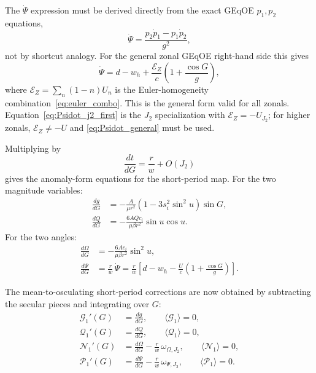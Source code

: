\documentclass[11pt]{article}
\begin{document}
The $\dot\Psi$ expression must be derived directly from the exact GEqOE
$p_1,p_2$ equations,
\begin{equation}
\dot\Psi = \frac{p_2 \dot p_1 - p_1 \dot p_2}{g^2},
\end{equation}
not by shortcut analogy. For the general zonal GEqOE right-hand side this
gives
\begin{equation}
\dot\Psi = d - w_h + \frac{\mathcal E_Z}{c}
\left(1 + \frac{\cos G}{g}\right),
\label{eq:Psidot_general}
\end{equation}
where $\mathcal E_Z = \sum_n (1-n) U_n$ is the Euler-homogeneity
combination~\eqref{eq:euler_combo}. This is the general form valid for
all zonals. Equation~\eqref{eq:Psidot_j2_first} is the $J_2$
specialization with $\mathcal E_Z = -U_{J_2}$; for higher zonals,
$\mathcal E_Z \neq -U$ and \eqref{eq:Psidot_general} must be used.

Multiplying by
\begin{equation}
\frac{dt}{dG} = \frac{r}{w} + O(J_2)
\end{equation}
gives the anomaly-form equations for the short-period map. For the two
magnitude variables:
\begin{align}
\frac{dg}{dG}
&= -\frac{A}{\mu r^2}
\left(1-3s_i^2\sin^2 u\right)\sin G,
\label{eq:dg_dG}\\
\frac{dQ}{dG}
&= -\frac{6A Q c_i}{\mu \beta r^2}\sin u \cos u.
\label{eq:dQ_dG}
\end{align}
For the two angles:
\begin{align}
\frac{d\Omega}{dG}
&= -\frac{6A c_i}{\mu \beta r^2}\sin^2 u,
\label{eq:dOmega_dG}\\
\frac{d\Psi}{dG}
&= \frac{r}{w}\,\dot\Psi
 = \frac{r}{w}
\left[
d - w_h - \frac{U}{c}\left(1 + \frac{\cos G}{g}\right)
\right].
\label{eq:dPsi_dG}
\end{align}

The mean-to-osculating short-period corrections are now obtained by subtracting
the secular pieces and integrating over $G$:
\begin{align}
\mathcal G_1'(G) &=
\frac{dg}{dG}, \qquad
\langle \mathcal G_1 \rangle = 0, \\
\mathcal Q_1'(G) &=
\frac{dQ}{dG}, \qquad
\langle \mathcal Q_1 \rangle = 0, \\
\mathcal N_1'(G) &=
\frac{d\Omega}{dG}
- \frac{r}{w}\,\omega_{\Omega,J_2},
\qquad
\langle \mathcal N_1 \rangle = 0, \\
\mathcal P_1'(G) &=
\frac{d\Psi}{dG}
- \frac{r}{w}\,\omega_{\Psi,J_2},
\qquad
\langle \mathcal P_1 \rangle = 0.
\label{eq:map_primes}
\end{align}
\end{document}
